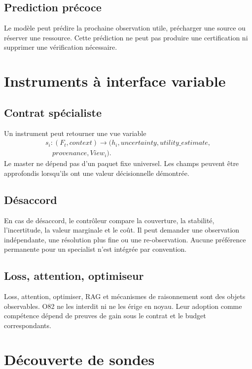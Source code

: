 \documentclass[11pt,a4paper]{report}
\begin{document}
\section{Prediction précoce}
Le modèle peut prédire la prochaine observation utile, précharger une source ou réserver une ressource. Cette prédiction ne peut pas produire une certification ni supprimer une vérification nécessaire.

\chapter{Instruments à interface variable}
\section{Contrat spécialiste}
Un instrument peut retourner une vue variable
\[
\begin{aligned}
s_i:(F_t,context)\to(h_i,uncertainty,utility\_estimate,\\
\quad provenance,View_i).
\end{aligned}
\]
Le master ne dépend pas d'un paquet fixe universel. Les champs peuvent être approfondis lorsqu'ils ont une valeur décisionnelle démontrée.

\section{Désaccord}
En cas de désaccord, le contrôleur compare la couverture, la stabilité, l'incertitude, la valeur marginale et le coût. Il peut demander une observation indépendante, une résolution plus fine ou une re-observation. Aucune préférence permanente pour un specialist n'est intégrée par convention.

\section{Loss, attention, optimiseur}
Loss, attention, optimiser, RAG et mécanismes de raisonnement sont des objets observables. O82 ne les interdit ni ne les érige en noyau. Leur adoption comme compétence dépend de preuves de gain sous le contrat et le budget correspondants.

\chapter{Découverte de sondes}
\end{document}
